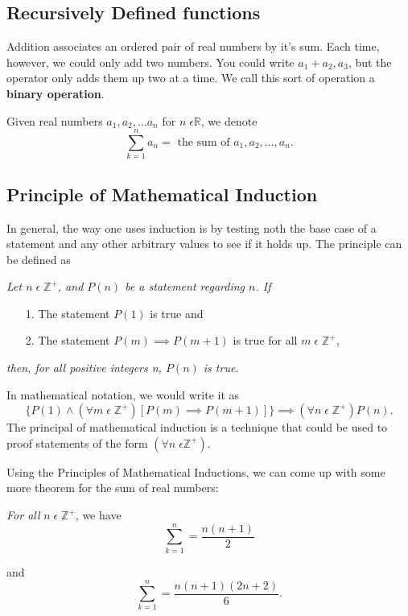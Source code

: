 \documentclass[a4paper]{article}
\begin{document}
\subsection{Recursively Defined functions}
Addition associates an ordered pair of real numbers by it's sum. Each time, however, we could only add two numbers. You could write $a_1 + a_2, a_3$, but the operator only adds them up two at a time. We call this sort of operation a \textbf{binary operation}.

Given real numbers $a_1, a_2, \ldots a_n$ for $n \; \epsilon \mathbb{R}$, we denote \[
	\sum_{k=1}^{n} a_n = \text{ the sum of } a_1,a_2,\ldots, a_n
.\]   
\subsection{Principle of Mathematical Induction}
In general, the way one uses induction is by testing noth the base case of a statement and any other arbitrary values to see if it holds up. The principle can be defined as
\begin{tcolorbox}[title=The Principle of Mathematical Induction]
\textit{Let $n \; \epsilon \; \mathbb{Z}^{+}$, and $P\left( n \right) $ be a statement regarding $n$. If}
	\begin{itemize}
		\item[1.] The statement $P\left( 1 \right) $ is true and
		\item[2.] The statement $P\left( m \right) \implies P\left( m + 1 \right)  $ is true for all $m \; \epsilon \; \mathbb{Z}^{+}$,	
	\end{itemize}
	\textit{then, for all positive integers n, $P\left( n \right)$ is true.}
\end{tcolorbox}

In mathematical notation, we would write it as \[
	\{P\left( 1 \right) \wedge \left( \forall m \; \epsilon \; \mathbb{Z}^{+} \right) [P\left( m \right) \implies P\left( m + 1 \right) ]  \} \implies \left( \forall n \; \epsilon \; \mathbb{Z}^{+} \right) P\left( n \right)   
.\]
The principal of mathematical induction is a technique that could be used to proof statements of the form $\left( \forall  n \; \epsilon \mathbb{Z}^{+} \right) $. 
	
Using the Principles of Mathematical Inductions, we can come up with some more theorem for the sum of real numbers:

\begin{tcolorbox}
	\textit{For all } $n \; \epsilon \; \mathbb{Z}^{+}$, we have \[ \sum_{k=1}^{n} = \frac{n\left( n + 1 \right) }{2} \]

	and \[ \sum_{k=1}^{n} = \frac{n\left( n+1 \right)\left( 2n+2 \right)}{6} .\]
\end{tcolorbox}
\end{document}
